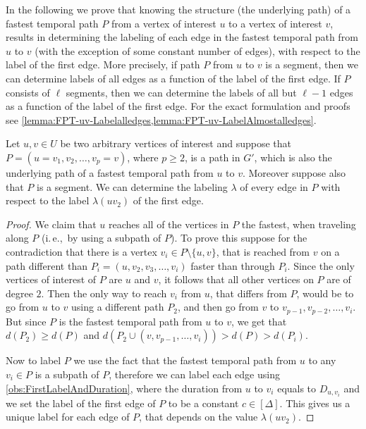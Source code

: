 \documentclass[a4paper,UKenglish,cleveref, autoref, thm-restate, anonymous]{lipics-v2021}
\newcommand{\ie}{i.\,e.,\ }
\begin{document}
In the following we prove that knowing the structure (the underlying path) of a fastest temporal path $P$ from a vertex of interest $u$ to a vertex of interest $v$,
results in determining the labeling of each edge in the fastest temporal path from $u$ to $v$ 
(with the exception of some constant number of edges), with respect to the label of the first edge.
More precisely, if path $P$ from $u$ to $v$ is a segment, then we can determine labels of all edges as a function of the label of the first edge.
If $P$ consists of $\ell$ segments, then we can determine the labels of all but $\ell -1$ edges as a function of the label of the first edge.
For the exact formulation and proofs see \cref{lemma:FPT-uv-Labelalledges,lemma:FPT-uv-LabelAlmostalledges}.

\begin{lemma}\label{lemma:FPT-uv-Labelalledges}
    Let $u, v \in U$ be two arbitrary vertices of interest and suppose that $P = (u=v_1,v_2, \dots, v_p = v)$, where $p \geq 2$, 
    is a path in $G'$, which is also the underlying path of a fastest temporal path from $u$ to $v$.
    Moreover suppose also that $P$ is a segment.
    We can determine the labeling $\lambda$ of every edge in $P$ with respect to the label $\lambda(uv_2)$ of the first edge.
\end{lemma}

\begin{proof}
We claim that $u$ reaches all of the vertices in $P$ the fastest, when traveling along $P$ (\ie by using a subpath of $P$).
To prove this suppose for the contradiction that there is a vertex $v_i \in P \setminus \{u,v\}$, that is reached from $v$ on a path different than $P_i = (u, v_2, v_3, \dots, v_i)$ faster than through $P_i$.
Since the only vertices of interest of $P$ are $u$ and $v$, it follows that all other vertices on $P$ are of degree $2$. 
Then the only way to reach $v_i$ from $u$, that differs from $P$, would be to go from $u$ to $v$ using a different path $P_2$,
and then go from $v$ to $v_{p-1}, v_{p-2}, \dots, v_i$.
But since $P$ is the fastest temporal path from $u$ to $v$, we get that $d(P_2) \geq d(P)$ and $d(P_2 \cup (v,v_{p-1}, \dots, v_i)) > d(P) > d(P_i)$.

Now to label $P$ we use the fact that the fastest temporal path from $u$ to any $v_i \in P$ is a subpath of $P$, 
therefore we can label each edge using \cref{obs:FirstLabelAndDuration},
where the duration from $u$ to $v_i$ equals to $D_{u,v_i}$ and 
we set the label of the first edge of $P$ to be a constant $c\in [\Delta]$.
This gives us a unique label for each edge of $P$, that depends on the value $\lambda(u v_2)$.
\end{proof}
\end{document}
